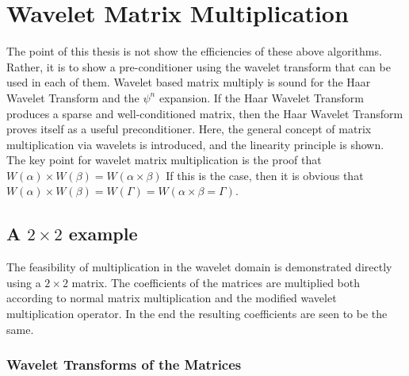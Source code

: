 \section {Wavelet Matrix Multiplication}
The point of this thesis is not show the efficiencies of these above algorithms.  Rather, it is to show a pre-conditioner using the wavelet transform that can be used in each of them.  %
Wavelet based matrix multiply is sound for the Haar Wavelet Transform and the $\psi^n$ expansion.   
If the Haar Wavelet Transform produces a sparse and well-conditioned matrix, then the Haar Wavelet Transform proves itself as a useful preconditioner.  %
Here, the general concept of matrix multiplication via wavelets is introduced, and the linearity principle is shown.  
The key point for wavelet matrix multiplication is the proof that $W(\alpha) \times W(\beta) = W(\alpha \times \beta)$  If this is the case, then it is obvious that $W(\alpha) \times W(\beta) = W(\Gamma) = W(\alpha \times \beta = \Gamma)$.  %



\subsection{A $2\times 2$ example}

The feasibility of multiplication in the wavelet domain is demonstrated directly using a $2 \times 2$ matrix. The coefficients of the matrices are multiplied both according to normal matrix multiplication and the modified wavelet multiplication operator. In the end the resulting coefficients are seen to be the same.

\subsubsection{Wavelet Transforms of the Matrices}

